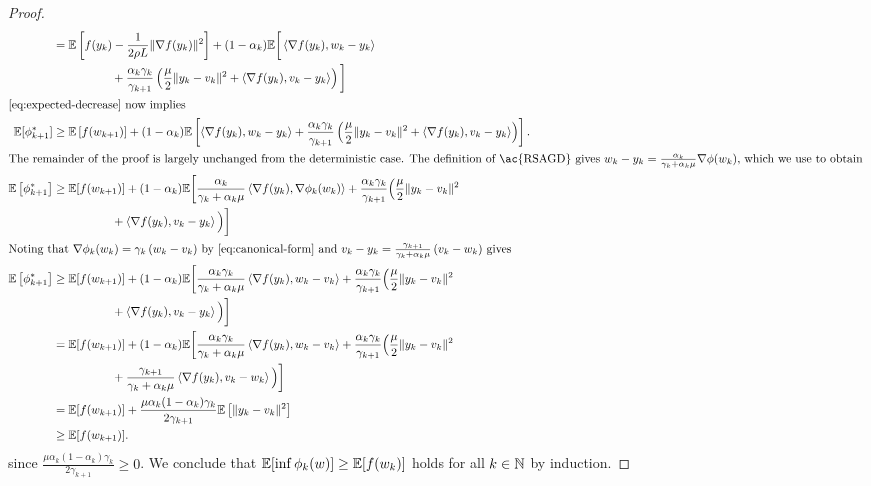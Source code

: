 \begin{proof}
\begin{align*}
        &=  \E\sbr{f(\yk) - \frac{1}{2\sgc L} \norm{\grad(\yk)}^2} + (1-\alpha_k) \E\bigg[\abr{\grad(\yk), \wk - \yk} \\ & \hspace{5em} + \frac{\alpha_k\gamma_k}{\gamma_{k+1}}\rbr{\frac{\mu}{2} \norm{\yk - v_k}^2 + \abr{\grad(\yk), v_k - \yk}}\bigg] \\
        \intertext{\autoref{eq:expected-decrease} now implies}
        \E[\phi_{k+1}^*] &\geq \E\sbr{f(\wkk)} + (1-\alpha_k) \E\sbr{\abr{\grad(\yk), \wk - \yk} + \frac{\alpha_k\gamma_k}{\gamma_{k+1}}\rbr{\frac{\mu}{2} \norm{\yk - v_k}^2 + \abr{\grad(\yk), v_k - \yk}}}. \\
        \intertext{The remainder of the proof is largely unchanged from the deterministic case. The definition of \ac{RSAGD} gives \( \wk - \yk = \frac{\alpha_k}{\gamma_k + \alpha_k \mu} \nabla \phi(\wk) \), which we use to obtain }
        \E\sbr{\phi_{k+1}^*}  &\geq  \E[f(\wkk)] + (1-\alpha_k) \E\bigg[\frac{\alpha_k}{\gamma_k + \alpha_k \mu} \abr{\grad(\yk), \nabla\phi_k(\wk)} + \frac{\alpha_k\gamma_k}{\gamma_{k+1}}\Big(\frac{\mu}{2} \norm{\yk - v_k}^2 \\ & \hspace{5em} + \abr{\grad(\yk), v_k - \yk}\Big)\bigg] \\
        \intertext{Noting that \( \nabla \phi_k(\wk) = \gamma_k \rbr{\wk - v_k} \) by \autoref{eq:canonical-form} and \( v_k - \yk = \frac{\gamma_{k+1}}{\gamma_k + \alpha_k \mu}\rbr{v_k - \wk} \) gives }
        \E\sbr{\phi_{k+1}^*} &\geq \E[f(\wkk)] +(1-\alpha_k) \E\bigg[\frac{\alpha_k \gamma_k}{\gamma_k + \alpha_k \mu} \abr{\grad(\yk), \wk - v_k} + \frac{\alpha_k\gamma_k}{\gamma_{k+1}}\Big(\frac{\mu}{2} \norm{\yk - v_k}^2 \\ & \hspace{5em} + \abr{\grad(\yk), v_k - \yk}\Big)\bigg] \\
        &= \E[f(\wkk)] + (1-\alpha_k) \E\bigg[\frac{\alpha_k \gamma_k}{\gamma_k + \alpha_k \mu} \abr{\grad(\yk), \wk - v_k} + \frac{\alpha_k\gamma_k}{\gamma_{k+1}}\Big(\frac{\mu}{2} \norm{\yk - v_k}^2 \\
        & \hspace{5em} + \frac{\gamma_{k+1}}{\gamma_k + \alpha_k \mu} \abr{\grad(\yk), v_k - \wk}\Big)\bigg] \\
        &= \E[f(\wkk)] + \frac{\mu \alpha_k(1-\alpha_k)\gamma_k}{2 \gamma_{k+1}} \E\sbr{\norm{\yk - v_k}^2} \\
        &\geq \E[f(\wkk)].
    \end{align*}
    since \( \frac{\mu \alpha_k(1-\alpha_k)\gamma_k}{2 \gamma_{k+1}} \geq 0 \). We conclude that \( \mathbb{E}[\inf \phi_{k}(w)] \geq \mathbb{E}[f(w_k)] \) holds for all \( k \in \mathbb{N} \) by induction. 
\end{proof}

